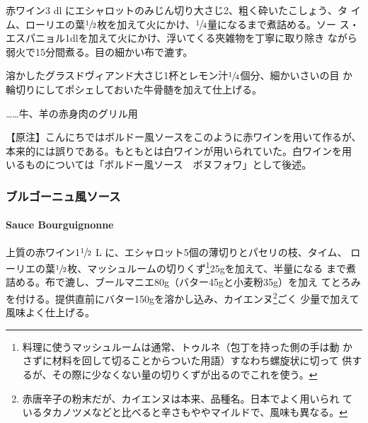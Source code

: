 \documentclass[twoside,12Q,b5j]{escoffierltjsbook}
\renewcommand{\ldots}{…}
\newenvironment{recette}{\begin{small}\begin{spacing}{1}\begin{multicols}{2}}{\end{multicols}\end{spacing}\end{small}}
\begin{document}
\begin{recette}

赤ワイン3 dl にエシャロットのみじん切り大さじ2、粗く砕いたこしょう、タ
イム、ローリエの葉\(\sfrac{1}{2}\)枚を加えて火にかけ、\(\sfrac{1}{4}\)量になるまで煮詰める。ソー
ス・エスパニョル1dlを加えて火にかけ、浮いてくる夾雑物を丁寧に取り除き
ながら弱火で15分間煮る。目の細かい布で漉す。

溶かしたグラスドヴィアンド大さじ1杯とレモン汁\(\sfrac{1}{4}\)個分、細かいさいの目
か輪切りにしてポシェしておいた牛骨髄を加えて仕上げる。

\ldots{}\ldots{}牛、羊の赤身肉のグリル用

【原注】こんにちではボルドー風ソースをこのように赤ワインを用いて作るが、
本来的には誤りである。もともとは白ワインが用いられていた。白ワインを用
いるものについては「ボルドー風ソース　ボヌフォワ」として後述。

\vspace*{1.7\zw}

\subsubsection{ブルゴーニュ風ソース}\label{ux30d6ux30ebux30b4ux30fcux30cbux30e5ux98a8ux30bdux30fcux30b9}

\paragraph{Sauce Bourguignonne}\label{sauce-bourgignonne}


上質の赤ワイン1\(\sfrac{1}{2}\) L
に、エシャロット5個の薄切りとパセリの枝、タイム、
ローリエの葉\(\sfrac{1}{2}\)枚、マッシュルームの切りくず\footnote{料理に使うマッシュルームは通常、トゥルネ（包丁を持った側の手は動
  かさずに材料を回して切ることからついた用語）すなわち螺旋状に切って
  供するが、その際に少なくない量の切りくずが出るのでこれを使う。}25gを加えて、半量になる
まで煮詰める。布で漉し、ブールマニエ80g（バター45gと小麦粉35g）を加え
てとろみを付ける。提供直前にバター150gを溶かし込み、カイエンヌ\footnote{赤唐辛子の粉末だが、カイエンヌは本来、品種名。日本でよく用いられ
  ているタカノツメなどと比べると辛さもややマイルドで、風味も異なる。}ごく
少量で加えて風味よく仕上げる。


\end{recette}
\end{document}
